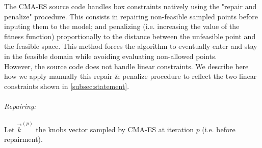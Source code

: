 The CMA-ES source code handles box constraints natively using the "repair and penalize" procedure. This consists in repairing non-feasible sampled points before inputing them to the model; and penalizing (i.e. increasing the value of the fitness function) proportionally to the distance between the unfeasible point and the feasible space. This method forces the algorithm to eventually enter and stay in the feasible domain while avoiding evaluating non-allowed points.\\
However, the source code does not handle linear constraints. We describe here how we apply manually this repair \& penalize procedure to reflect the two linear constraints shown in \ref{subsec:statement}.\\
\\
%
\emph{Repairing:}\\
\\
Let $\underline{\vec{k}}^{(p)}$ the knobs vector sampled by CMA-ES at iteration $p$ (i.e. before repairment).\\
